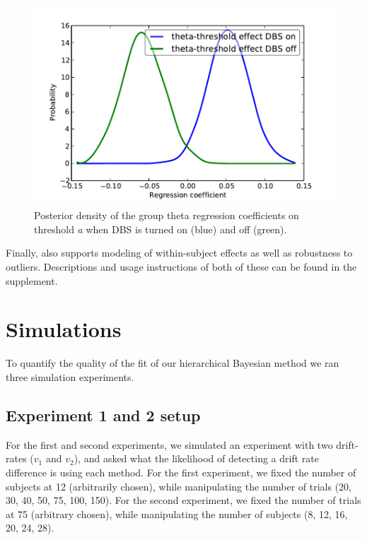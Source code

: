 \documentclass[letterpaper,10pt,english]{article}
\begin{document}
\begin{figure}
\includegraphics[scale=0.6]{theta_threshold_on_off.pdf}
\caption{Posterior density of the group theta regression coefficients
on threshold \emph{a} when DBS is turned on (blue) and off (green).}
\label{fig.post_theta}
\end{figure}

Finally,  also supports modeling of within-subject effects
as well as robustness to outliers. Descriptions and usage instructions
of both of these can be found in the supplement.

\section*{Simulations}

To quantify the quality of the fit of our hierarchical Bayesian method
we ran three simulation experiments.

\subsection*{Experiment 1 and 2 setup}
For the first and second experiments, we simulated an experiment with
two drift-rates ($v_{\text{1}}$ and $v_{\text{2}}$), and asked what
the likelihood of detecting a drift rate difference is using each
method. For the first experiment, we fixed the number of subjects at
12 (arbitrarily chosen), while manipulating the number of trials (20,
30, 40, 50, 75, 100, 150).  For the second experiment, we fixed the
number of trials at 75  (arbitrary chosen), while manipulating the
number of subjects (8, 12, 16, 20, 24, 28).
\end{document}
